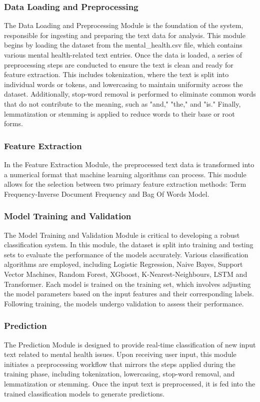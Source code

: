 \subsubsection{Data Loading and Preprocessing}
\noindent
The Data Loading and Preprocessing Module is the foundation of the system, responsible for ingesting and preparing the text data for analysis. This module begins by loading the dataset from the mental\_health.csv file, which contains various mental health-related text entries. Once the data is loaded, a series of preprocessing steps are conducted to ensure the text is clean and ready for feature extraction. This includes tokenization, where the text is split into individual words or tokens, and lowercasing to maintain uniformity across the dataset. Additionally, stop-word removal is performed to eliminate common words that do not contribute to the meaning, such as "and," "the," and "is." Finally, lemmatization or stemming is applied to reduce words to their base or root forms.

\subsubsection{Feature Extraction}
\noindent
In the Feature Extraction Module, the preprocessed text data is transformed into a numerical format that machine learning algorithms can process. This module allows for the selection between two primary feature extraction methods: Term Frequency-Inverse Document Frequency and Bag Of Words Model.

\subsubsection{Model Training and Validation}
\noindent
The Model Training and Validation Module is critical to developing a robust classification system. In this module, the dataset is split into training and testing sets to evaluate the performance of the models accurately. Various classification algorithms are employed, including Logistic Regression, Naive Bayes, Support Vector Machines, Random Forest, XGboost, K-Nearest-Neighbours, LSTM and Transformer. Each model is trained on the training set, which involves adjusting the model parameters based on the input features and their corresponding labels. Following training, the models undergo validation to assess their performance. 

\subsubsection{Prediction}
\noindent
The Prediction Module is designed to provide real-time classification of new input text related to mental health issues. Upon receiving user input, this module initiates a preprocessing workflow that mirrors the steps applied during the training phase, including tokenization, lowercasing, stop-word removal, and lemmatization or stemming. Once the input text is preprocessed, it is fed into the trained classification models to generate predictions.

